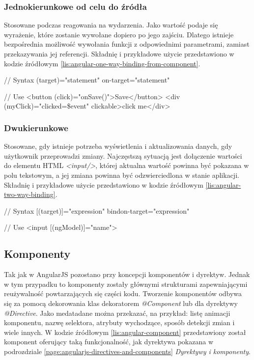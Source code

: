	\subsubsection*{Jednokierunkowe od celu do źródła}
	Stosowane podczas reagowania na wydarzenia.	Jako wartość podaje się wyrażenie, które zostanie wywołane dopiero po jego zajściu. Dlatego istnieje bezpośrednia możliwość wywołania funkcji z odpowiednimi parametrami, zamiast przekazywania jej referencji. Składnię i przykładowe użycie przedstawiono w kodzie źródłowym \ref{lis:angular-one-way-binding-from-component}.
	
	\begin{code}[
		language=javascript,
		caption={Składnia i użycie dołączenia jednokierunkowego od celu do źródła (źródło: \cite{angular-template-syntax})},
		label={lis:angular-one-way-binding-from-component},
		escapechar=|,
		keywords={},
	]
// Syntax
(target)="statement"
on-target="statement"

// Use
<button (click)="onSave()">Save</button>
<div (myClick)="clicked=\$event" clickable>click me</div>
	\end{code}
	
	\subsubsection*{Dwukierunkowe}
	Stosowane, gdy istnieje potrzeba wyświetlenia i aktualizowania danych, gdy użytkownik przeprowadzi zmiany. Najczęstszą sytuacją jest dołączenie wartości do elementu HTML \textit{<input/>}, której aktualna wartość powinna być pokazana w polu tekstowym, a jej zmiana powinna być odzwierciedlona w stanie aplikacji. Składnię i przykładowe użycie przedstawiono w kodzie źródłowym \ref{lis:angular-two-way-binding}.
	
	\begin{code}[
		language=javascript,
		caption={Składnia i użycie dołączenia dwukierunkowego (źródło: \cite{angular-template-syntax})},
		label={lis:angular-two-way-binding},
		escapechar=|,
		keywords={},
	]
// Syntax
[(target)]="expression"
bindon-target="expression"

// Use
<input [(ngModel)]="name">
	\end{code}
	
	\subsection{Komponenty}
	Tak jak w AngularJS pozostano przy koncepcji komponentów i dyrektyw. Jednak w tym przypadku to komponenty zostały głównymi strukturami zapewniającymi reużywalność powtarzających się części kodu. Tworzenie komponentów odbywa się za pomocą dekorowania klas dekoratorem \textit{@Component} lub dla dyrektywy \textit{@Directive}. Jako medatadane można przekazać, na przykład: listę animacji komponentu, nazwę selektora, atrybuty wychodzące, sposób detekcji zmian i wiele innych. W kodzie źródłowym \ref{lis:angular-component} przedstawiony został komponent oferujący taką funkcjonalność, jak dyrektywa pokazana w podrozdziale \ref{page:angularjs-directives-and-components} \textit{Dyrektywy i komponenty}.
	

